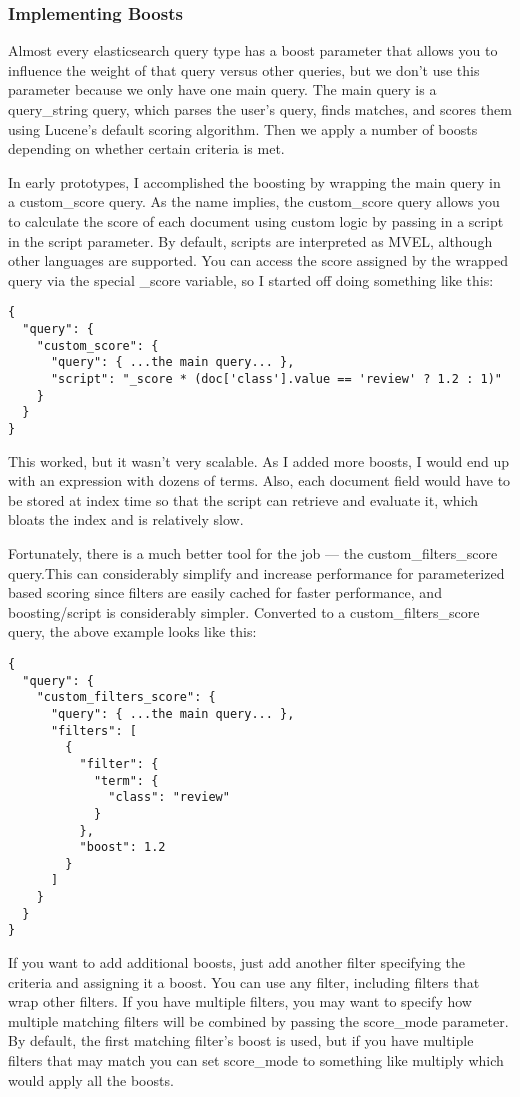 \subsubsection{Implementing Boosts}
Almost every elasticsearch query type has a boost parameter that allows you to influence the weight of that query versus other queries, but we don’t use this parameter because we only have one main query. The main query is a query\_string query, which parses the user’s query, finds matches, and scores them using Lucene’s default scoring algorithm. Then we apply a number of boosts depending on whether certain criteria is met.
\par In early prototypes, I accomplished the boosting by wrapping the main query in a custom\_score query. As the name implies, the custom\_score query allows you to calculate the score of each document using custom logic by passing in a script in the script parameter. By default, scripts are interpreted as MVEL, although other languages are supported. You can access the score assigned by the wrapped query via the special \_score variable, so I started off doing something like this:
\begin{verbatim}
{
  "query": {
    "custom_score": {
      "query": { ...the main query... },
      "script": "_score * (doc['class'].value == 'review' ? 1.2 : 1)"
    }
  }
}
\end{verbatim}
\par This worked, but it wasn’t very scalable. As I added more boosts, I would end up with an expression with dozens of terms. Also, each document field would have to be stored at index time so that the script can retrieve and evaluate it, which bloats the index and is relatively slow. 
\par Fortunately, there is a much better tool for the job — the custom\_filters\_score query.This can considerably simplify and increase performance for parameterized based scoring since filters are easily cached for faster performance, and boosting/script is considerably simpler. Converted to a custom\_filters\_score query, the above example looks like this:
\begin{verbatim}
{
  "query": {
    "custom_filters_score": {
      "query": { ...the main query... },
      "filters": [
        {
          "filter": {
            "term": {
              "class": "review"
            }
          },
          "boost": 1.2
        }
      ]
    }
  }
}
\end{verbatim}
\par If you want to add additional boosts, just add another filter specifying the criteria and assigning it a boost. You can use any filter, including filters that wrap other filters. If you have multiple filters, you may want to specify how multiple matching filters will be combined by passing the score\_mode parameter. By default, the first matching filter’s boost is used, but if you have multiple filters that may match you can set score\_mode to something like multiply which would apply all the boosts.
